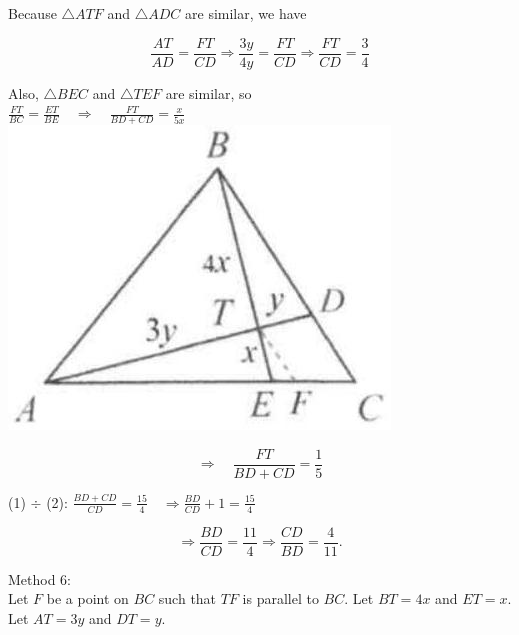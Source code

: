 \documentclass[10pt]{article}
\begin{document}
Because \(\triangle A T F\) and \(\triangle A D C\) are similar, we have

\[
\frac{A T}{A D}=\frac{F T}{C D} \Rightarrow \frac{3 y}{4 y}=\frac{F T}{C D} \Rightarrow \frac{F T}{C D}=\frac{3}{4}
\]

Also, \(\triangle B E C\) and \(\triangle T E F\) are similar, so\\
\(\frac{F T}{B C}=\frac{E T}{B E} \quad \Rightarrow \quad \frac{F T}{B D+C D}=\frac{x}{5 x}\)\\
\includegraphics[max width=\textwidth, center]{2025_04_17_97bc1f7e44d93c271a88g-105(1)}

\[
\Rightarrow \quad \frac{F T}{B D+C D}=\frac{1}{5}
\]

(1) \(\div\) (2): \(\frac{B D+C D}{C D}=\frac{15}{4} \quad \Rightarrow \frac{B D}{C D}+1=\frac{15}{4}\)

\[
\Rightarrow \frac{B D}{C D}=\frac{11}{4} \Rightarrow \frac{C D}{B D}=\frac{4}{11} .
\]

Method 6:\\
Let \(F\) be a point on \(B C\) such that \(T F\) is parallel to \(B C\). Let \(B T=4 x\) and \(E T=x\). Let \(A T=3 y\) and \(D T=y\).
\end{document}
